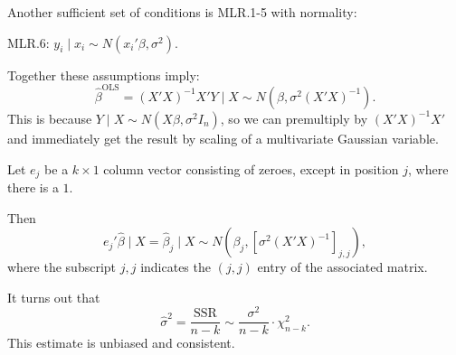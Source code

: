 \begin{remark}	Another sufficient set of conditions is MLR.1-5 with normality:
	
	MLR.6: $y_i \mid x_i \sim N(x_i' \beta, \sigma^2)$.
	
	Together these assumptions imply: \[
		\hat{\beta}^{\text{OLS}} = (X'X)^{-1} X' Y \mid X \sim N(\beta, \sigma^2 (X'X)^{-1})
	.\] 
	This is because $Y \mid X \sim N(X\beta, \sigma^2 I_n)$, so we can premultiply by $\left( X'X \right)^{-1}X'$ and immediately get the result by scaling of a multivariate Gaussian variable.
\end{remark}

\begin{proposition}
	Let $e_j$ be a $k \times 1$ column vector consisting of zeroes, except in position $j$, where there is a $1$.
	
	Then \[
		e_j' \hat{\beta} \mid X = \hat{\beta}_j \mid X \sim N(\beta_j, [\sigma^2 (X'X)^{-1}]_{j,j})
		,\] where the subscript $j,j$ indicates the $(j,j)$ entry of the associated matrix.
	
	It turns out that \[
		\hat{\sigma}^2 = \frac{\text{SSR}}{n-k} \sim \frac{\sigma^2}{n-k} \cdot \chi^2_{n-k}
	.\] 
	This estimate is unbiased and consistent.
	\end{proposition}
	
